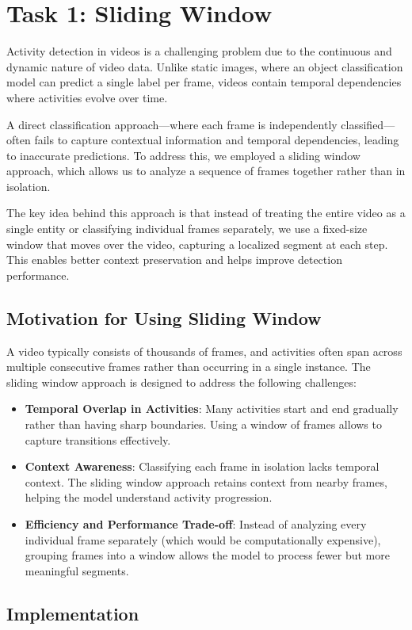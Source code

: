 \documentclass{article}
\begin{document}
\section{Task 1: Sliding Window}
Activity detection in videos is a challenging problem due to the continuous and dynamic nature of video data. Unlike static images, where an object classification model can predict a single label per frame, videos contain temporal dependencies where activities evolve over time.

A direct classification approach—where each frame is independently classified—often fails to capture contextual information and temporal dependencies, leading to inaccurate predictions. To address this, we employed a sliding window approach, which allows us to analyze a sequence of frames together rather than in isolation.

The key idea behind this approach is that instead of treating the entire video as a single entity or classifying individual frames separately, we use a fixed-size window that moves over the video, capturing a localized segment at each step. This enables better context preservation and helps improve detection performance.

\subsection{Motivation for Using Sliding Window}
A video typically consists of thousands of frames, and activities often span across multiple consecutive frames rather than occurring in a single instance. The sliding window approach is designed to address the following challenges:
\begin{itemize}
    \item \textbf{Temporal Overlap in Activities}: Many activities start and end gradually rather than having sharp boundaries. Using a window of frames allows to capture transitions effectively.
    \item \textbf{Context Awareness}: Classifying each frame in isolation lacks temporal context. The sliding window approach retains context from nearby frames, helping the model understand activity progression.
    \item \textbf{Efficiency and Performance Trade-off}: Instead of analyzing every individual frame separately (which would be computationally expensive), grouping frames into a window allows the model to process fewer but more meaningful segments.
\end{itemize}
\subsection{Implementation}
\end{document}
